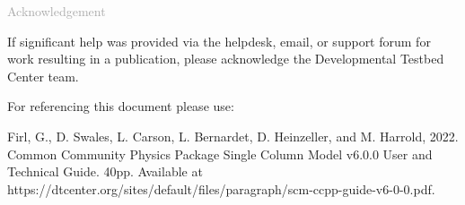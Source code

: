 \begin{titlepage}
\vspace*{0.5cm}
\noindent

\begin{flushleft}
\textcolor{darkgray}{\LARGE Acknowledgement}
\vspace*{1cm}\par

If significant help was provided via the helpdesk, email, or support forum for work resulting in a publication, please acknowledge the Developmental Testbed Center team.\\
\vspace*{1cm}\par
For referencing this document please use:\\
\vspace*{1cm}\par
Firl, G., D. Swales, L. Carson, L. Bernardet, D. Heinzeller, and M. Harrold, 2022. Common Community Physics Package Single Column Model v6.0.0 User and Technical Guide. 40pp. Available at https://dtcenter.org/sites/default/files/paragraph/scm-ccpp-guide-v6-0-0.pdf. 

\end{flushleft}
\end{titlepage}
\pagebreak{}
